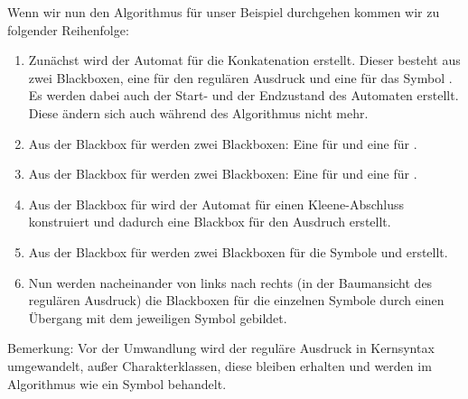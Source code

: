 Wenn wir nun den Algorithmus für unser Beispiel durchgehen kommen wir zu folgender Reihenfolge:
\begin{enumerate}
  \item Zunächst wird der Automat für die Konkatenation  erstellt. Dieser besteht aus zwei Blackboxen, eine für den regulären Ausdruck  und eine für das Symbol . Es werden dabei auch der Start- und der Endzustand des Automaten erstellt. Diese ändern sich auch während des Algorithmus nicht mehr.
  \item Aus der Blackbox für  werden zwei Blackboxen: Eine für  und eine für .
  \item Aus der Blackbox für  werden zwei Blackboxen: Eine für  und eine für .
  \item Aus der Blackbox für  wird der Automat für einen Kleene-Abschluss konstruiert und dadurch eine Blackbox für den Ausdruch  erstellt.
  \item Aus der Blackbox für  werden zwei Blackboxen für die Symbole  und  erstellt.
  \item Nun werden nacheinander von links nach rechts (in der Baumansicht des regulären Ausdruck) die Blackboxen für die einzelnen Symbole durch einen Übergang mit dem jeweiligen Symbol gebildet.
\end{enumerate}

Bemerkung: Vor der Umwandlung wird der reguläre Ausdruck in Kernsyntax umgewandelt, außer Charakterklassen, diese bleiben erhalten und werden im Algorithmus wie ein Symbol behandelt.
